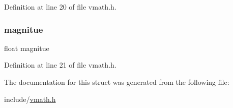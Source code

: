 Definition at line 20 of file vmath.\+h.

\mbox{\label{structpolar__cord_a16ebe6028d7fa6cbd5cd673819eecb9f}} 
\subsubsection{\texorpdfstring{magnitue}{magnitue}}
{\footnotesize\ttfamily float magnitue}



Definition at line 21 of file vmath.\+h.



The documentation for this struct was generated from the following file\+:\begin{DoxyCompactItemize}
\item 
include/\hyperlink{vmath_8h}{vmath.\+h}\end{DoxyCompactItemize}
